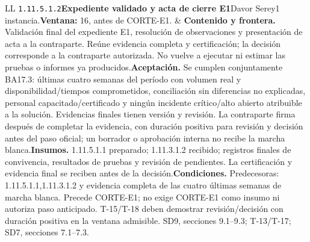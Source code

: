 \begin{longtable}{L{\tabcolsep\relax}L{\tabcolsep\relax}}
\texttt{1.\allowbreak{}11.\allowbreak{}5.\allowbreak{}1.\allowbreak{}2}\newline{}\textbf{Expediente validado y acta de cierre E1}\newline{}Davor Serey\newline{}1 instancia.\newline{}\textbf{Ventana:} 16, antes de CORTE-E1. & \textbf{Contenido y frontera.} Validación final del expediente E1, resolución de observaciones y presentación de acta a la contraparte. Reúne evidencia completa y certificación; la decisión corresponde a la contraparte autorizada. No vuelve a ejecutar ni estimar las pruebas o informes ya producidos.\newline{}\textbf{Aceptación.} Se cumplen conjuntamente BA17.3: últimas cuatro semanas del período con volumen real y disponibilidad/tiempos comprometidos, conciliación sin diferencias no explicadas, personal capacitado/certificado y ningún incidente crítico/alto abierto atribuible a la solución. Evidencias finales tienen versión y revisión. La contraparte firma después de completar la evidencia, con duración positiva para revisión y decisión antes del paso oficial; un borrador o aprobación interna no recibe la marcha blanca.\newline{}\textbf{Insumos.} 1.11.5.1.1 preparado; 1.11.3.1.2 recibido; registros finales de convivencia, resultados de pruebas y revisión de pendientes. La certificación y evidencia final se reciben antes de la decisión.\newline{}\textbf{Condiciones.} Predecesoras: 1.11.5.1.1,1.11.3.1.2 y evidencia completa de las cuatro últimas semanas de marcha blanca. Precede CORTE-E1; no exige CORTE-E1 como insumo ni autoriza paso anticipado. T-15/T-18 deben demostrar revisión/decisión con duración positiva en la ventana admisible. SD9, secciones 9.1--9.3; T-13/T-17; SD7, secciones 7.1--7.3.\\\hline

\end{longtable}
